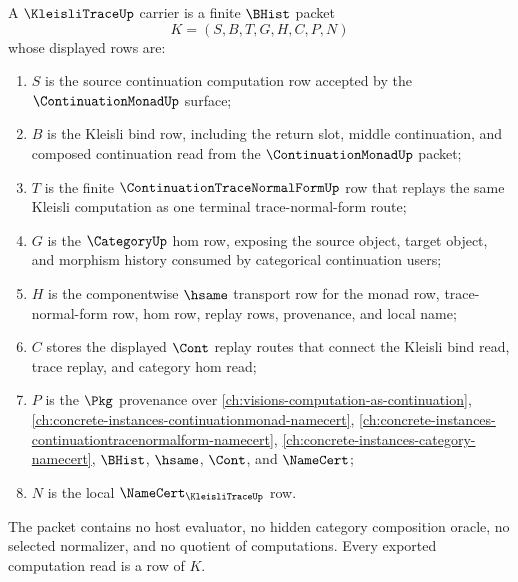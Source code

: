 \begin{definition}
\label{def:kleisli-trace-carrier}
A $\KleisliTraceUp$ carrier is a finite $\BHist$ packet
$$
K=(S,B,T,G,H,C,P,N)
$$
whose displayed rows are:
\begin{enumerate}
\item $S$ is the source continuation computation row accepted by the $\ContinuationMonadUp$ surface;
\item $B$ is the Kleisli bind row, including the return slot, middle continuation, and composed continuation read from the $\ContinuationMonadUp$ packet;
\item $T$ is the finite $\ContinuationTraceNormalFormUp$ row that replays the same Kleisli computation as one terminal trace-normal-form route;
\item $G$ is the $\CategoryUp$ hom row, exposing the source object, target object, and morphism history consumed by categorical continuation users;
\item $H$ is the componentwise $\hsame$ transport row for the monad row, trace-normal-form row, hom row, replay rows, provenance, and local name;
\item $C$ stores the displayed $\Cont$ replay routes that connect the Kleisli bind read, trace replay, and category hom read;
\item $P$ is the $\Pkg$ provenance over \autoref{ch:visions-computation-as-continuation}, \autoref{ch:concrete-instances-continuationmonad-namecert}, \autoref{ch:concrete-instances-continuationtracenormalform-namecert}, \autoref{ch:concrete-instances-category-namecert}, $\BHist$, $\hsame$, $\Cont$, and $\NameCert$;
\item $N$ is the local $\NameCert_{\KleisliTraceUp}$ row.
\end{enumerate}
The packet contains no host evaluator, no hidden category composition oracle, no selected normalizer, and no quotient of computations. Every exported computation read is a row of $K$.
\end{definition}

